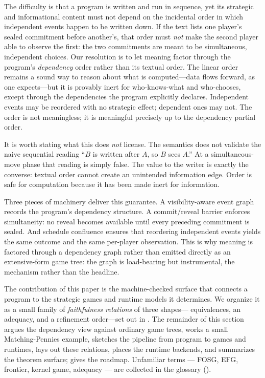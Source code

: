 The difficulty is that a program is written and run in sequence, yet its
strategic and informational content must not depend on the incidental order
in which independent events happen to be written down.  If the text lists one
player's sealed commitment before another's, that order must \emph{not} make
the second player able to observe the first: the two commitments are meant to
be simultaneous, independent choices.  Our resolution is to let meaning
factor through the program's \emph{dependency} order rather than its textual
order.  The linear order remains a sound way to reason about what is
computed---data flows forward, as one expects---but it is provably inert for
who-knows-what and who-chooses, except through the dependencies the program
explicitly declares.  Independent events may be reordered with no strategic
effect; dependent ones may not.  The order is not meaningless; it is
meaningful precisely up to the dependency partial order.

It is worth stating what this does \emph{not} license.  The semantics does
not validate the naive sequential reading ``\(B\) is written after \(A\), so
\(B\) sees \(A\).''  At a simultaneous-move phase that reading is simply
false.  The value to the writer is exactly the converse: textual order cannot
create an unintended information edge.  Order is safe for computation because
it has been made inert for information.

Three pieces of machinery deliver this guarantee.  A visibility-aware event
graph records the program's dependency structure.  A commit/reveal barrier
enforces simultaneity: no reveal becomes available until every preceding
commitment is sealed.  And schedule confluence ensures that reordering
independent events yields the same outcome and the same per-player
observation.  This is why meaning is factored through a dependency graph
rather than emitted directly as an extensive-form game tree: the graph is
load-bearing but instrumental, the mechanism rather than the headline.

The contribution of this paper is the machine-checked surface that connects a
program to the strategic games and runtime models it determines.  We organize
it as a small family of \emph{faithfulness relations} of three shapes---%
equivalences, an adequacy, and a refinement order---set out in
.  The remainder of this section argues the
dependency view against ordinary game trees, works a small Matching-Pennies
example, sketches the pipeline from program to games and runtimes, lays out
these relations, places the runtime backends, and summarizes the theorem
surface;  gives the roadmap.  Unfamiliar terms ---
FOSG, EFG, frontier, kernel game, adequacy --- are collected in the
glossary ().

